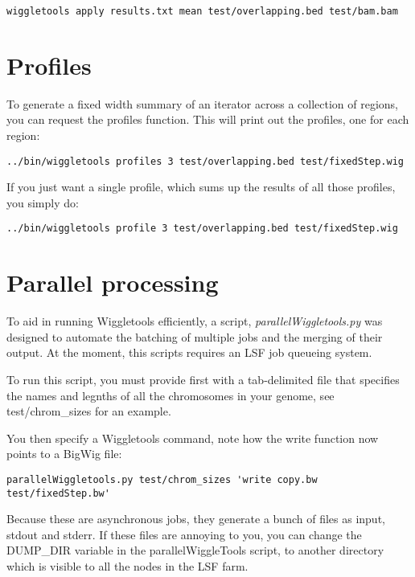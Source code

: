 \documentclass[12pt]{article}
\begin{document}
\begin{verbatim}
wiggletools apply results.txt mean test/overlapping.bed test/bam.bam 
\end{verbatim}

\section{Profiles}

To generate a fixed width summary of an iterator across a collection of regions, you can request the profiles function. This will print out the profiles, one for each region:

\begin{verbatim}
../bin/wiggletools profiles 3 test/overlapping.bed test/fixedStep.wig
\end{verbatim}

If you just want a single profile, which sums up the results of all those profiles, you simply do:

\begin{verbatim}
../bin/wiggletools profile 3 test/overlapping.bed test/fixedStep.wig
\end{verbatim}

\section{Parallel processing}

To aid in running Wiggletools efficiently, a script, \emph{parallelWiggletools.py} was designed to automate the batching of multiple jobs and the merging of their output. At the moment, this scripts requires an LSF job queueing system.

To run this script, you must provide first with a tab-delimited file that specifies the names and legnths of all the chromosomes in your genome, see test/chrom\_sizes for an example.

You then specify a Wiggletools command, note how the write function now points to a BigWig file:

\begin{verbatim}
parallelWiggletools.py test/chrom_sizes 'write copy.bw test/fixedStep.bw'
\end{verbatim}

Because these are asynchronous jobs, they generate a bunch of files as input, stdout and stderr. If these files are annoying to you, you can change the DUMP\_DIR variable in the parallelWiggleTools script, to another directory which is visible to all the nodes in the LSF farm.
\end{document}
